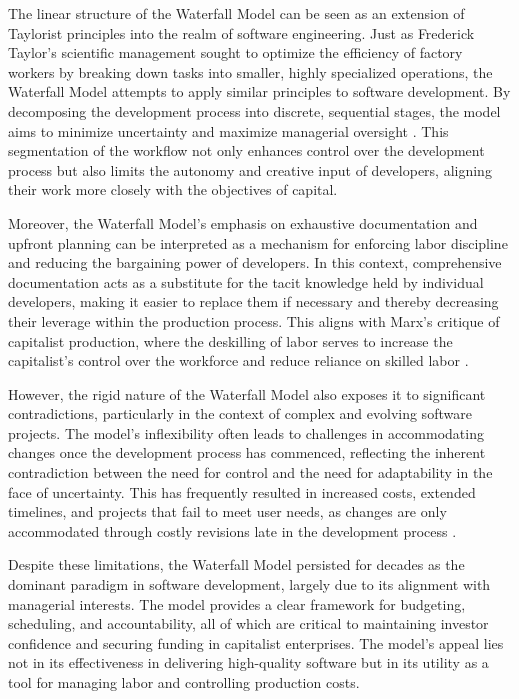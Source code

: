 \begin{refsection}
The linear structure of the Waterfall Model can be seen as an extension of Taylorist principles into the realm of software engineering. Just as Frederick Taylor's scientific management sought to optimize the efficiency of factory workers by breaking down tasks into smaller, highly specialized operations, the Waterfall Model attempts to apply similar principles to software development. By decomposing the development process into discrete, sequential stages, the model aims to minimize uncertainty and maximize managerial oversight \cite[pp.~45-48]{Pressman2005}. This segmentation of the workflow not only enhances control over the development process but also limits the autonomy and creative input of developers, aligning their work more closely with the objectives of capital.

Moreover, the Waterfall Model’s emphasis on exhaustive documentation and upfront planning can be interpreted as a mechanism for enforcing labor discipline and reducing the bargaining power of developers. In this context, comprehensive documentation acts as a substitute for the tacit knowledge held by individual developers, making it easier to replace them if necessary and thereby decreasing their leverage within the production process. This aligns with Marx’s critique of capitalist production, where the deskilling of labor serves to increase the capitalist's control over the workforce and reduce reliance on skilled labor \cite[pp.~133-136]{Braverman1998}.

However, the rigid nature of the Waterfall Model also exposes it to significant contradictions, particularly in the context of complex and evolving software projects. The model's inflexibility often leads to challenges in accommodating changes once the development process has commenced, reflecting the inherent contradiction between the need for control and the need for adaptability in the face of uncertainty. This has frequently resulted in increased costs, extended timelines, and projects that fail to meet user needs, as changes are only accommodated through costly revisions late in the development process \cite[pp.~92-94]{Glass1997}.

Despite these limitations, the Waterfall Model persisted for decades as the dominant paradigm in software development, largely due to its alignment with managerial interests. The model provides a clear framework for budgeting, scheduling, and accountability, all of which are critical to maintaining investor confidence and securing funding in capitalist enterprises. The model’s appeal lies not in its effectiveness in delivering high-quality software but in its utility as a tool for managing labor and controlling production costs.


\end{refsection}
